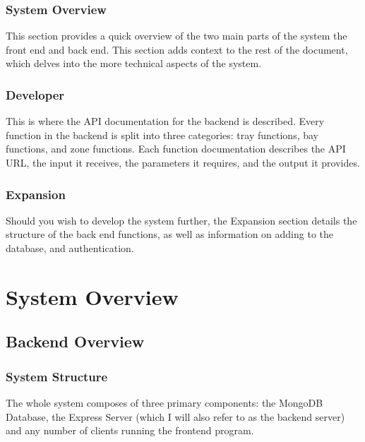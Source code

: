 \documentclass[letterpaper,10pt,english]{sphinxmanual}
\let\oldsubsection\subsection
\renewcommand{\subsection}{\needspace{6\baselineskip}\oldsubsection}
\begin{document}
\subsection{System Overview}
\label{\detokenize{Introduction:system-overview}}
This section provides a quick overview of the two main parts of the
system \sphinxhyphen{} the front end and back end. This section adds context to the
rest of the document, which delves into the more technical aspects of
the system.


\subsection{Developer}
\label{\detokenize{Introduction:developer}}
This is where the API documentation for the backend is described. Every
function in the backend is split into three categories: tray functions,
bay functions, and zone functions. Each function documentation describes
the API URL, the input it receives, the parameters it requires, and the
output it provides.


\subsection{Expansion}
\label{\detokenize{Introduction:expansion}}
\begin{DUlineblock}{0em}
\item[] Should you wish to develop the system further, the Expansion section
details the structure of the back end functions, as well as
information on adding to the database, and authentication.
\item[] 
\end{DUlineblock}


\chapter{System Overview}
\label{\detokenize{index:system-overview}}

\section{Backend Overview}
\label{\detokenize{docs/System_Overview/Backend_overview:backend-overview}}\label{\detokenize{docs/System_Overview/Backend_overview::doc}}

\subsection{System Structure}
\label{\detokenize{docs/System_Overview/Backend_overview:system-structure}}
The whole system composes of three primary components: the MongoDB
Database, the Express Server (which I will also refer to as the back\sphinxhyphen{}end
server) and any number of clients running the front\sphinxhyphen{}end program.
\end{document}
